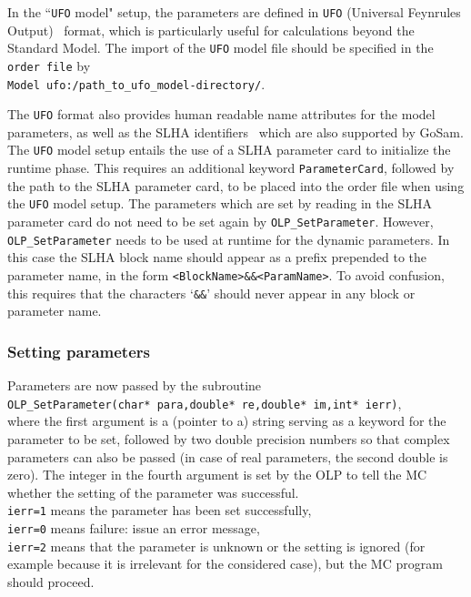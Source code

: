 In the ``{\tt UFO} model" setup, the parameters are defined in {\tt UFO} (Universal Feynrules
Output)~\cite{Degrande:2011ua} format, which is particularly useful for
calculations beyond the Standard Model.
The import of the {\tt UFO} model file should be specified in the {\tt order file} 
by \\{\tt Model ufo:/path\_to\_ufo\_model-directory/}.

The {\tt UFO}  format also provides human readable name attributes for the 
model parameters, as well as the 
SLHA identifiers~\cite{Skands:2003cj} which are also supported by GoSam.
The {\tt UFO} model setup entails the use of a SLHA parameter card to initialize the runtime phase.
This requires an additional keyword {\tt ParameterCard}, followed by the path to the SLHA parameter card,
to be placed into the order file when using the {\tt UFO} model setup. 
The parameters which are set by reading in the SLHA parameter card do not need to be set 
again by {\tt OLP\_SetParameter}. However, {\tt OLP\_SetParameter} needs to be used at 
runtime for the dynamic parameters. 
In this case the SLHA block name should appear as a prefix prepended to the parameter name, 
in the form  
{\tt <BlockName>\&\&<ParamName>}.
To avoid confusion, this requires that the characters `{\tt \&\&}' should never appear in 
any block or parameter name.

\subsubsection{Setting parameters}
Parameters are now passed by the subroutine \\
{\tt OLP\_SetParameter(char*~para,double*~re,double*~im,int* ierr)},\\

where the first argument is a (pointer to a) string serving as a keyword 
for the parameter to be set, followed by two double precision numbers
so that complex parameters can also be passed (in case of real parameters, 
the second double is zero). The integer in the fourth argument 
is set by the OLP to tell the MC whether the setting of the parameter 
was successful.\\
{\tt ierr=1} means the parameter has been set successfully, \\
{\tt ierr=0} means failure: issue an error message, \\
{\tt ierr=2} means that the parameter is unknown 
or the setting is ignored (for example because it is irrelevant 
for the considered case), but the MC program should proceed.


